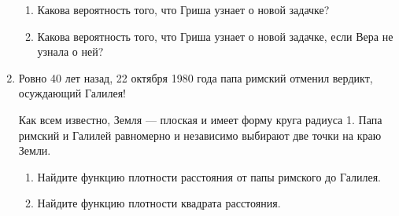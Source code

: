 \documentclass[12pt]{article}
\begin{document}
\begin{enumerate}[resume]
    \begin{enumerate}
        \item Какова вероятность того, что Гриша узнает о новой задачке?
        \item Какова вероятность того, что Гриша узнает о новой задачке, если Вера не узнала о ней?
    \end{enumerate}
    
    \item Ровно 40 лет назад, 22 октября 1980 года папа римский отменил вердикт, осуждающий Галилея!


    Как всем известно, Земля — плоская и имеет форму круга радиуса 1. 
    Папа римский и Галилей равномерно и независимо выбирают две точки на краю Земли.

    \begin{enumerate}
        \item Найдите функцию плотности расстояния от папы римского до Галилея.
        \item Найдите функцию плотности квадрата расстояния.
    \end{enumerate}
    

    

    

\end{enumerate}
\end{document}
